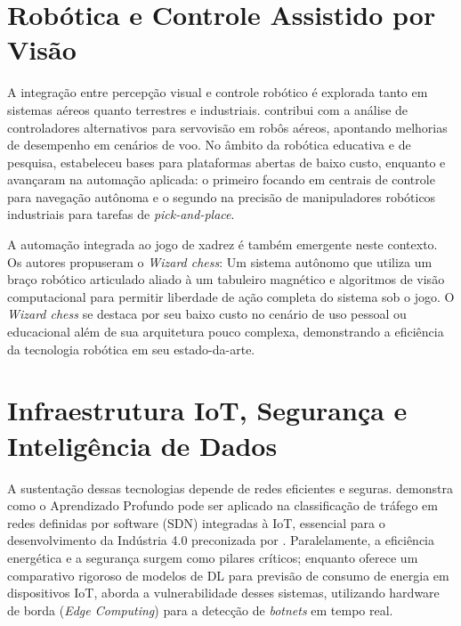\section*{Robótica e Controle Assistido por Visão}

A integração entre percepção visual e controle robótico é explorada tanto em sistemas aéreos quanto terrestres e industriais.  contribui com a análise de controladores alternativos para servovisão em robôs aéreos, apontando melhorias de desempenho em cenários de voo. No âmbito da robótica educativa e de pesquisa,  estabeleceu bases para plataformas abertas de baixo custo, enquanto  e  avançaram na automação aplicada: o primeiro focando em centrais de controle para navegação autônoma e o segundo na precisão de manipuladores robóticos industriais para tarefas de \textit{pick-and-place}.

A automação integrada ao jogo de xadrez é também emergente neste contexto. Os autores  propuseram o \textit{Wizard chess}: Um sistema autônomo que utiliza um braço robótico articulado aliado à um tabuleiro magnético e algoritmos de visão computacional para permitir liberdade de ação completa do sistema sob o jogo. O \textit{Wizard chess} se destaca por seu baixo custo no cenário de uso pessoal ou educacional além de sua arquitetura pouco complexa, demonstrando a eficiência da tecnologia robótica em seu estado-da-arte.

\section*{Infraestrutura IoT, Segurança e Inteligência de Dados}

A sustentação dessas tecnologias depende de redes eficientes e seguras.  demonstra como o Aprendizado Profundo pode ser aplicado na classificação de tráfego em redes definidas por software (SDN) integradas à IoT, essencial para o desenvolvimento da Indústria 4.0 preconizada por . Paralelamente, a eficiência energética e a segurança surgem como pilares críticos; enquanto  oferece um comparativo rigoroso de modelos de DL para previsão de consumo de energia em dispositivos IoT,  aborda a vulnerabilidade desses sistemas, utilizando hardware de borda (\textit{Edge Computing}) para a detecção de \textit{botnets} em tempo real.

